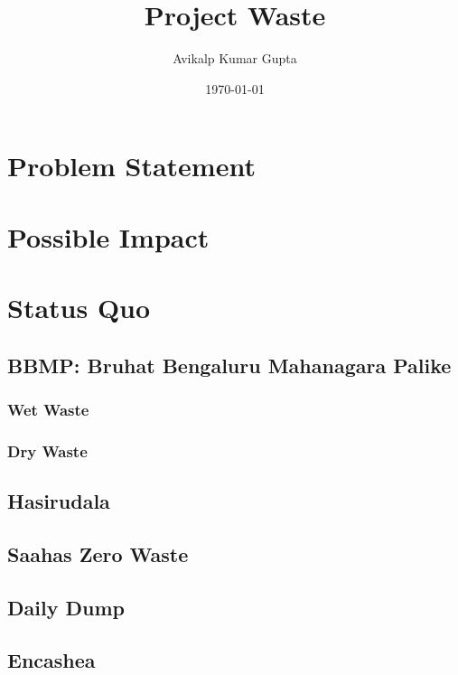 \documentclass[10pt]{article}
\title{Project Waste}
\author{Avikalp Kumar Gupta}
\date{\today}
\begin{document}
\maketitle

\begin{abstract}
\end{abstract}

\section{Problem Statement}

\section{Possible Impact}

\section{Status Quo}

\subsection{BBMP: Bruhat Bengaluru Mahanagara Palike}

\subsubsection{Wet Waste}

\subsubsection{Dry Waste}

\subsection{Hasirudala}

\subsection{Saahas Zero Waste}

\subsection{Daily Dump}

\subsection{Encashea}
\end{document}
